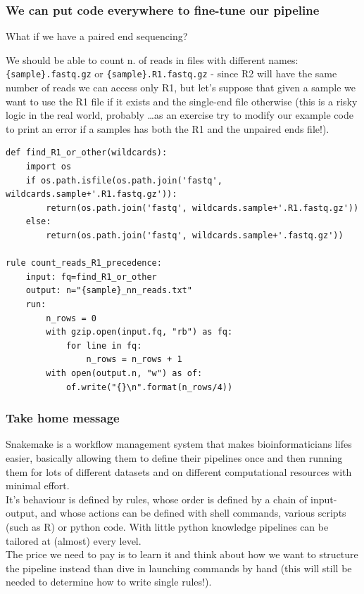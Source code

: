 \documentclass[xcolor=table]{beamer}
\begin{document}
\begin{frame}
\frametitle{We can put code everywhere to fine-tune our pipeline}
What if we have a paired end sequencing?

We should be able to count n. of reads in \textcolor{beer}{files with different names}:
\texttt{\{sample\}.fastq.gz} or \texttt{\{sample\}.R1.fastq.gz} - since R2 will have the same
number of reads we can access only R1, but let's suppose that given a sample we want to use the R1 file
if it exists and the single-end file otherwise (this is a risky logic in the real world, probably \ldots as an 
exercise try to modify our example code to print an error if a samples has both the R1 and the unpaired ends file!).

\end{frame}


\begin{frame}[fragile]
\begin{lstlisting}[basicstyle=\tiny]
def find_R1_or_other(wildcards):
    import os
    if os.path.isfile(os.path.join('fastq', wildcards.sample+'.R1.fastq.gz')):
        return(os.path.join('fastq', wildcards.sample+'.R1.fastq.gz'))
    else:
        return(os.path.join('fastq', wildcards.sample+'.fastq.gz'))

rule count_reads_R1_precedence:
    input: fq=find_R1_or_other
    output: n="{sample}_nn_reads.txt"
    run: 
        n_rows = 0
        with gzip.open(input.fq, "rb") as fq:
            for line in fq:
                n_rows = n_rows + 1
        with open(output.n, "w") as of:
            of.write("{}\n".format(n_rows/4))
\end{lstlisting}
\end{frame}


\begin{frame}
\frametitle{Take home message}
Snakemake is a workflow management system that makes bioinformaticians lifes easier, basically allowing them
to define their \textcolor{galon}{pipelines} once and then running them for lots of different datasets and on different
computational resources with minimal effort. \\
It's behaviour is defined by \textcolor{novak}{rules}, whose order is defined by a chain of input-output, and whose actions
can be defined with shell commands, various scripts (such as R) or python code. With little python knowledge pipelines can be tailored
at (almost) every level.
\\ The price we need to pay is to learn it and think about how we want to structure
the pipeline instead than dive in launching commands by hand (this will still be needed to determine how to write single rules!).
\end{frame}
\end{document}
